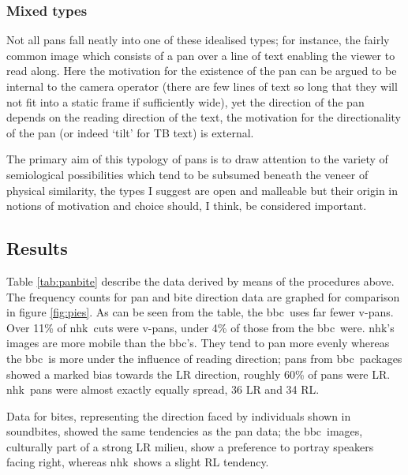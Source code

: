 \documentclass[11pt, oneside, a4paper]{scrartcl}
\newcommand{\bbc} {{\sc bbc}}
\newcommand{\nhk} {{\sc nhk}}
\begin{document}
\subsubsection{Mixed types} Not all pans fall neatly into one of these idealised types; for instance, the fairly common image which consists of a pan over a line of text enabling the viewer to read along. Here the motivation for the existence of the pan can be argued to be internal to the camera operator (there are few lines of text so long that they will not fit into a static frame if sufficiently wide), yet the direction of the pan depends on the reading direction of the text, the motivation for the directionality of the pan (or indeed `tilt' for TB text) is external. 

\bigskip

The primary aim of this typology of pans is to draw attention to the variety of semiological possibilities which tend to be subsumed beneath the veneer of physical similarity, the types I suggest are open and malleable but their origin in notions of motivation and choice should, I think, be considered important.

\subsection{Results\label{sec:results}}

Table \ref{tab:panbite} describe the data derived by means of the procedures above. The frequency counts for pan and bite direction data are graphed for comparison in figure \ref{fig:pies}. As can be seen from the table, the \bbc\ uses far fewer {\sc v-pans}. Over 11\% of \nhk\ cuts were {\sc v-pans}, under 4\% of those from the \bbc\ were. {\sc nhk}'s images are more mobile than the {\sc bbc}'s. They tend to pan more evenly whereas the \bbc\ is more under the influence of reading direction; pans from \bbc\ packages showed a marked bias towards the LR direction, roughly 60\% of pans were LR. \nhk\ pans were almost exactly equally spread, 36 LR and 34 RL.

Data for bites, representing the direction faced by individuals shown in soundbites, showed the same tendencies as the pan data; the \bbc\ images, culturally part of a strong LR milieu, show a preference to portray speakers facing right, whereas \nhk\, shows a  slight RL tendency.
\end{document}
